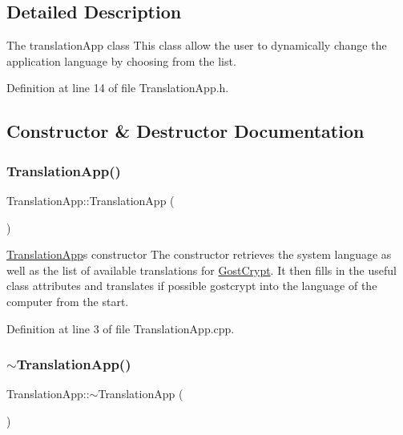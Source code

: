 \subsection{Detailed Description}
The translation\+App class This class allow the user to dynamically change the application language by choosing from the list. 

Definition at line 14 of file Translation\+App.\+h.



\subsection{Constructor \& Destructor Documentation}
\mbox{\label{class_translation_app_af88e0052999d427bfcdaccf28e89ba8a}} 
\subsubsection{\texorpdfstring{Translation\+App()}{TranslationApp()}}
{\footnotesize\ttfamily Translation\+App\+::\+Translation\+App (\begin{DoxyParamCaption}{ }\end{DoxyParamCaption})}



\hyperlink{class_translation_app}{Translation\+App}\textquotesingle{}s constructor The constructor retrieves the system language as well as the list of available translations for \hyperlink{namespace_gost_crypt}{Gost\+Crypt}. It then fills in the useful class attributes and translates if possible gostcrypt into the language of the computer from the start. 



Definition at line 3 of file Translation\+App.\+cpp.

\mbox{\label{class_translation_app_addb9ee7608e2de19d535a5d2352e1cc4}} 
\subsubsection{\texorpdfstring{$\sim$\+Translation\+App()}{~TranslationApp()}}
{\footnotesize\ttfamily Translation\+App\+::$\sim$\+Translation\+App (\begin{DoxyParamCaption}{ }\end{DoxyParamCaption})}



